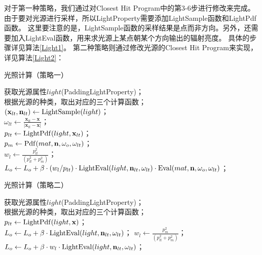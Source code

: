 对于第一种策略，我们通过对Closest Hit Program中的第3-6步进行修改来完成。
由于要对光源进行采样，所以LightProperty需要添加LightSample函数和LightPdf函数。
这里要注意的是，LightSample函数的采样结果是点而非方向。另外，还需要加入LightEval函数，用来求光源上某点朝某个方向输出的辐射亮度。
具体的步骤详见算法\ref{Light1}。
第二种策略则通过修改光源的Closest Hit Program来实现，详见算法\ref{Light2}：

\begin{algorithm}
    \caption{光照计算（策略一）}
    \label{Light1}

    获取光源属性$light$(PaddingLightProperty)；\\
    根据光源的种类，取出对应的三个计算函数；\\
    $(\textbf{x}_{lt}, \textbf{n}_{lt}) \leftarrow {\rm LightSample}(light)$；\\
    $\omega_{lt} \leftarrow \frac{\textbf{x}_{lt}-\textbf{x}}{|\textbf{x}_{lt}-\textbf{x}|}$；\\
    $p_{lt} \leftarrow {\rm LightPdf}(light, \textbf{x}_{lt})$；\\
    $p_m \leftarrow {\rm Pdf}(mat, \textbf{n}, \omega_o, \omega_{lt})$；\\
    $w_l \leftarrow \frac{p_{lt}^2}{(p_{lt}^2+p_m^2)}$；\\
    {$L_o \leftarrow L_o+\beta\cdot(w_l/p_{lt})\cdot {\rm LightEval}(light, \textbf{n}_{lt}, \omega_{lt})\cdot {\rm Eval}(mat, \textbf{n}, \omega_o, \omega_{lt}) $；} 
\end{algorithm}
\begin{algorithm}
    \caption{光照计算（策略二）}
    \label{Light2}

    获取光源属性$light$(PaddingLightProperty)；\\
    根据光源的种类，取出对应的三个计算函数；\\
    $p_{lt} \leftarrow {\rm LightPdf}(light, \textbf{x})$；\\
    {
        $L_o \leftarrow L_o+\beta\cdot{\rm LightEval}(light, \textbf{n}_{lt}, \omega_{lt}) $；
    } 
    {
        $w_l \leftarrow \frac{p_m^2}{(p_{lt}^2+p_m^2)}$；\\
        $L_o \leftarrow L_o+\beta\cdot w_l\cdot {\rm LightEval}(light, \textbf{n}_{lt}, \omega_{lt}) $；
    }
\end{algorithm}

